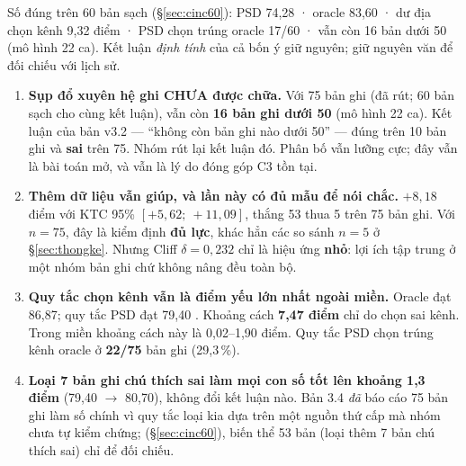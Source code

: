 \begin{canhbao}
 Số đúng trên 60 bản sạch (\S\ref{sec:cinc60}): PSD 74,28 · oracle 83,60 · dư địa chọn kênh 9,32 điểm · PSD chọn trúng oracle 17/60 · vẫn còn 16 bản dưới 50 (mô hình 22 ca). Kết luận \emph{định tính} của cả bốn ý giữ nguyên; giữ nguyên văn để đối chiếu với lịch sử.
\end{canhbao}
\begin{enumerate}[leftmargin=1.6em,itemsep=4pt]
\item \textbf{Sụp đổ xuyên hệ ghi CHƯA được chữa.} Với 75 bản ghi (đã rút; 60 bản sạch cho cùng kết luận), vẫn còn \textbf{16 bản ghi dưới 50}
(mô hình 22 ca). Kết luận của bản v3.2 --- ``không còn bản ghi nào dưới 50'' --- đúng trên 10 bản ghi và
\textbf{sai} trên 75. Nhóm rút lại kết luận đó. Phân bố vẫn lưỡng cực; đây vẫn là bài toán mở, và vẫn là
lý do đóng góp C3 tồn tại.
\item \textbf{Thêm dữ liệu vẫn giúp, và lần này có đủ mẫu để nói chắc.} $+8{,}18$ điểm với KTC 95\%
$[+5{,}62;\ +11{,}09]$, thắng 53 thua 5 trên 75 bản ghi. Với $n = 75$, đây là kiểm định \textbf{đủ lực},
khác hẳn các so sánh $n = 5$ ở \S\ref{sec:thongke}. Nhưng Cliff $\delta = 0{,}232$ chỉ là hiệu ứng
\textbf{nhỏ}: lợi ích tập trung ở một nhóm bản ghi chứ không nâng đều toàn bộ.
\item \textbf{Quy tắc chọn kênh vẫn là điểm yếu lớn nhất ngoài miền.} Oracle đạt 86,87; quy tắc PSD đạt
79,40 . Khoảng cách \textbf{7,47 điểm}  chỉ do chọn sai kênh. Trong miền khoảng cách này là 0,02--1,90 điểm.
Quy tắc PSD chọn trúng kênh oracle ở \textbf{22/75} bản ghi (29,3\,\%).
\item \textbf{Loại 7 bản ghi chú thích sai làm mọi con số tốt lên khoảng 1,3 điểm} (79,40 $\to$ 80,70),
không đổi kết luận nào. Bản 3.4 \emph{đã} báo cáo 75 bản ghi làm số chính vì quy tắc loại kia dựa trên một nguồn thứ
cấp mà nhóm chưa tự kiểm chứng;  (\S\ref{sec:cinc60}), biến thể 53 bản (loại thêm 7 bản chú thích sai) chỉ để đối chiếu.
\end{enumerate}
